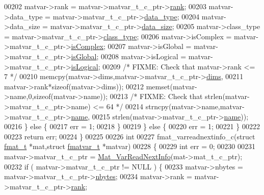 \begin{DoxyCode}
{{00202             matvar->rank       = matvar->matvar\_t\_c\_ptr->\hyperlink{group___m_a_t_a84ba70c96ded13cc555fa75b768d9921}{rank};
00203             matvar->data\_type  = matvar->matvar\_t\_c\_ptr->\hyperlink{group___m_a_t_ab6aafe9bd77f0f077852593dec438144}{data\_type};
00204             matvar->data\_size  = matvar->matvar\_t\_c\_ptr->\hyperlink{group___m_a_t_a9ad1c82e2b568da617e12dc73a26e1f9}{data\_size};
00205             matvar->class\_type = matvar->matvar\_t\_c\_ptr->\hyperlink{group___m_a_t_aff13035bf3265dd7d9425e5d40c839d4}{class\_type};
00206             matvar->isComplex  = matvar->matvar\_t\_c\_ptr->\hyperlink{group___m_a_t_aeb03b3a69f108dc05470b00443a43739}{isComplex};
00207             matvar->isGlobal   = matvar->matvar\_t\_c\_ptr->\hyperlink{group___m_a_t_af26c71c4c0ddb14931d15910dddac1bc}{isGlobal};
00208             matvar->isLogical  = matvar->matvar\_t\_c\_ptr->\hyperlink{group___m_a_t_a866c1539e68073a837833d74cd4a65be}{isLogical};
00209             \textcolor{comment}{/* FIXME: Check that matvar->rank <= 7 */}
00210             memcpy(matvar->dims,matvar->matvar\_t\_c\_ptr->\hyperlink{group___m_a_t_a8e01234e1c862ce3472bb37f5a09b92c}{dims},
00211                    matvar->rank*\textcolor{keyword}{sizeof}(matvar->dims));
00212             memset(matvar->name,0,\textcolor{keyword}{sizeof}(matvar->name));
00213             \textcolor{comment}{/* FIXME: Check that strlen(matvar->matvar\_t\_c\_ptr->name) <= 64 */}
00214             strncpy(matvar->name,matvar->matvar\_t\_c\_ptr->\hyperlink{group___m_a_t_a5d4b55b041e3b4fb50c04337f05ad909}{name},
00215                     strlen(matvar->matvar\_t\_c\_ptr->\hyperlink{group___m_a_t_a5d4b55b041e3b4fb50c04337f05ad909}{name}));
00216         \} \textcolor{keywordflow}{else} \{
00217             err = 1;
00218         \}
00219     \} \textcolor{keywordflow}{else} \{
00220         err = 1;
00221     \}
00222 
00223     \textcolor{keywordflow}{return} err;
00224 \}
00225 
00226 \textcolor{keywordtype}{int}
00227 fmat\_varreadnextinfo\_c(\textcolor{keyword}{struct} \hyperlink{structfmat__t}{fmat\_t} *mat,\textcolor{keyword}{struct} \hyperlink{structfmatvar__t}{fmatvar\_t} *matvar)
00228 \{
00229     \textcolor{keywordtype}{int}   err = 0;
00230 
00231     matvar->matvar\_t\_c\_ptr = \hyperlink{group___m_a_t_ga72dd99330507b17177e22f9ed3bea5e6}{Mat\_VarReadNextInfo}(mat->mat\_t\_c\_ptr);
00232     \textcolor{keywordflow}{if} ( matvar->matvar\_t\_c\_ptr != NULL ) \{
00233         matvar->nbytes     = matvar->matvar\_t\_c\_ptr->\hyperlink{group___m_a_t_abf1c844540503be2df9bb3db93cfe307}{nbytes};
00234         matvar->rank       = matvar->matvar\_t\_c\_ptr->\hyperlink{group___m_a_t_a84ba70c96ded13cc555fa75b768d9921}{rank};
}}
\end{DoxyCode}
